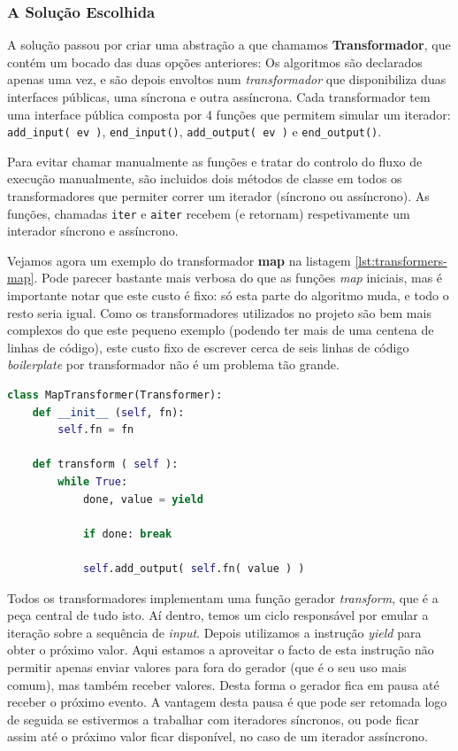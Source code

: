 \subsubsection{A Solução Escolhida}
A solução passou por criar uma abstração a que chamamos \textbf{Transformador}, que contém um bocado das duas opções anteriores: Os algoritmos são declarados apenas uma vez, e são depois envoltos num \textit{transformador} que disponibiliza duas interfaces públicas, uma síncrona e outra assíncrona. Cada transformador tem uma interface pública composta por 4 funções que permitem simular um iterador: \verb|add_input( ev )|, \verb|end_input()|, \verb|add_output( ev )| e \verb|end_output()|.

Para evitar chamar manualmente as funções e tratar do controlo do fluxo de execução manualmente, são incluidos dois métodos de classe em todos os transformadores que permiter correr um iterador (síncrono ou assíncrono). As funções, chamadas \texttt{iter} e \texttt{aiter} recebem (e retornam) respetivamente um interador síncrono e assíncrono.

Vejamos agora um exemplo do transformador \textbf{map} na listagem \ref{lst:transformers-map}. Pode parecer bastante mais verbosa do que as funções \textit{map} iniciais, mas é importante notar que este custo é fixo: só esta parte do algoritmo muda, e todo o resto seria igual. Como os transformadores utilizados no projeto são bem mais complexos do que este pequeno exemplo (podendo ter mais de uma centena de linhas de código), este custo fixo de escrever cerca de seis linhas de código \textit{boilerplate} por transformador não é um problema tão grande.

\begin{lstlisting}[caption={Implementação da função \texttt{map} usando a nossa abordagem de transformadores},label={lst:transformers-map},language=Python]
class MapTransformer(Transformer):
    def __init__ (self, fn):
        self.fn = fn
    
    def transform ( self ):
        while True:
            done, value = yield

            if done: break
            
            self.add_output( self.fn( value ) )
\end{lstlisting}

Todos os transformadores implementam uma função gerador \textit{transform}, que é a peça central de tudo isto. Aí dentro, temos um ciclo responsável por emular a iteração sobre a sequência de \textit{input}. Depois utilizamos a instrução \textit{yield} para obter o próximo valor. Aqui estamos a aproveitar o facto de esta instrução não permitir apenas enviar valores para fora do gerador (que é o seu uso mais comum), mas também receber valores. Desta forma o gerador fica em pausa até receber o próximo evento. A vantagem desta pausa é que pode ser retomada logo de seguida se estivermos a trabalhar com iteradores síncronos, ou pode ficar assim até o próximo valor ficar disponível, no caso de um iterador assíncrono.

